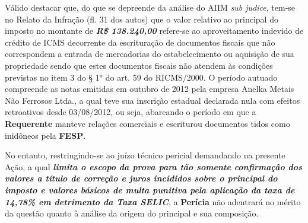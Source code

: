 Válido destacar que, do que se depreende da análise do AIIM \textit{sub judice}, tem-se no Relato da Infração (fl. 31 dos autos) que o valor relativo ao principal do imposto no montante
de \emph{\textbf{R\$ 138.240,00}} refere-se ao aproveitamento indevido de crédito de ICMS decorrente da escrituração de documentos fiscais que não correspondem a entrada de mercadorias do estabelecimento ou aquisição de sua propriedade sendo que estes documentos fiscais não atendem às condições previstas no item 3 do § 1° do art. 59 do RICMS/2000.
O período autuado compreende as notas emitidas em outubro de 2012 pela empresa Anelka Metais Não Ferrosos Ltda., a qual teve sua inscrição estadual declarada nula com efeitos retroativos desde 03/08/2012, ou seja, abarcando o período em que a \textbf{Requerente} manteve relações comerciais e escriturou documentos tidos como inidôneos pela \textbf{FESP}.

No entanto, restringindo-se ao juízo técnico pericial demandando na presente Ação, a qual \emph{\textbf{limita o escopo da prova para tão somente confirmação dos valores a título de correção e juros incididos sobre o principal do imposto e valores básicos de multa punitiva pela aplicação da taxa de 14,78\% em detrimento da Taxa SELIC}}, a \textbf{Perícia} não adentrará no mérito da questão quanto à análise da origem do principal e sua composição.
